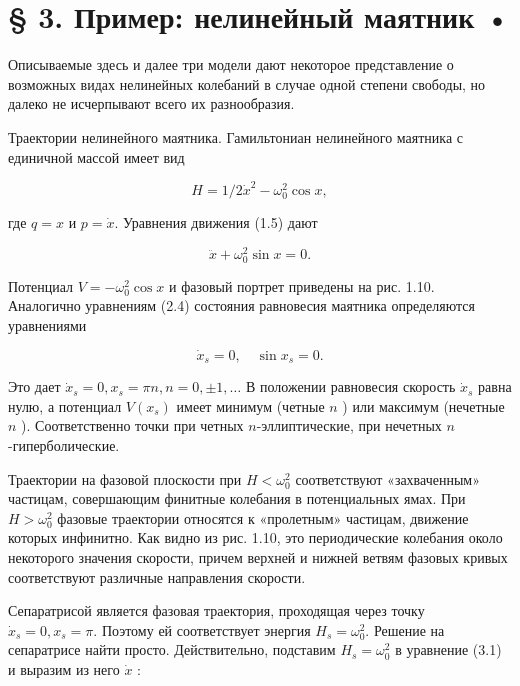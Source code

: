 \documentclass[10pt]{article}
\begin{document}
\section*{§ 3. Пример: нелинейный маятник •}
Описываемые здесь и далее три модели дают некоторое представление о возможных видах нелинейных колебаний в случае одной степени свободы, но далеко не исчерпывают всего их разнообразия.

Траектории нелинейного маятника. Гамильтониан нелинейного маятника с единичной массой имеет вид


\begin{equation*}
H=1 / 2 \dot{x}^{2}-\omega_{0}^{2} \cos x, \tag{3.1}
\end{equation*}


где $q=x$ и $p=\dot{x}$. Уравнения движения (1.5) дают


\begin{equation*}
\ddot{x}+\omega_{0}^{2} \sin x=0 . \tag{3.2}
\end{equation*}


Потенциал $V=-\omega_{0}^{2} \cos x$ и фазовый портрет приведены на рис. 1.10.\\
Аналогично уравнениям (2.4) состояния равновесия маятника определяются уравнениями


\begin{equation*}
\dot{x}_{s}=0, \quad \sin x_{s}=0 . \tag{3.3}
\end{equation*}


Это дает $\dot{x}_{s}=0, x_{s}=\pi n, n=0, \pm 1, \ldots$ В положении равновесия скорость $\dot{x}_{s}$ равна нулю, а потенциал $V\left(x_{s}\right)$ имеет минимум (четные $n$ ) или максимум (нечетные $n$ ). Соответственно точки при четных $n$-эллиптические, при нечетных $n$-гиперболические.

Траектории на фазовой плоскости при $H<\omega_{0}^{2}$ соответствуют «захваченным» частицам, совершающим финитные колебания в потенциальных ямах. При $H>\omega_{0}^{2}$ фазовые траектории относятся к «пролетным» частицам, движение которых инфинитно. Как видно из рис. 1.10, это периодические колебания около некоторого значения скорости, причем верхней и нижней ветвям фазовых кривых соответствуют различные направления скорости.

Сепаратрисой является фазовая траектория, проходящая через точку $\dot{x}_{s}=0, x_{s}=\pi$. Поэтому ей соответствует энергия $H_{s}=\omega_{0}^{2}$. Решение на сепаратрисе найти просто. Действительно, подставим $H_{s}=\omega_{0}^{2}$ в уравнение (3.1) и выразим из него $\dot{x}$ :
\end{document}
